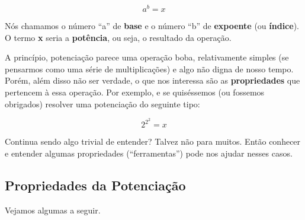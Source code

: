 \begin{equation}
    a^b=x
\end{equation}

Nós chamamos o número ``a'' de \textbf{base} e o número ``b'' de \textbf{expoente} (ou \textbf{índice}). O termo \textbf{x} seria a \textbf{potência}, ou seja, o resultado da operação.

A princípio, potenciação parece uma operação boba, relativamente simples (se pensarmos como uma série de multiplicações) e algo não digna de nosso tempo. Porém, além disso não ser verdade, o que nos interessa são as \textbf{propriedades} que pertencem à essa operação. Por exemplo, e se quiséssemos (ou fossemos obrigados) resolver uma potenciação do seguinte tipo:

\begin{equation}
    2^{2^{2}} = x
\end{equation}

Continua sendo algo trivial de entender? Talvez não para muitos. Então conhecer e entender algumas propriedades (``ferramentas'') pode nos ajudar nesses casos. 

\subsection{Propriedades da Potenciação}
\label{propriedades_da_potenciacao}
Vejamos algumas a seguir.


